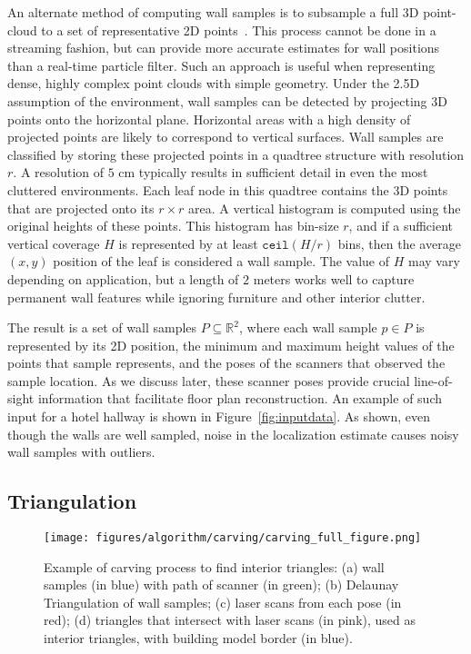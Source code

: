 \documentclass[a4paper,twoside]{article}
\begin{document}
An alternate method of computing wall samples is to subsample a full 3D point-cloud to a set of representative 2D points~\cite{Eigencrust,Okorn09}.  This process cannot be done in a streaming fashion, but can provide more accurate estimates for wall positions than a real-time particle filter.  Such an approach is useful when representing dense, highly complex point clouds with simple geometry.  Under the 2.5D assumption of the environment, wall samples can be detected by projecting 3D points onto the horizontal plane.  Horizontal areas with a high density of projected points are likely to correspond to vertical surfaces.  Wall samples are classified by storing these projected points in a quadtree structure with resolution $r$.  A resolution of $5$ cm typically results in sufficient detail in even the most cluttered environments.  Each leaf node in this quadtree contains the 3D points that are projected onto its $r \times r$ area.  A vertical histogram is computed using the original heights of these points.  This histogram has bin-size $r$, and if a sufficient vertical coverage $H$ is represented by at least $\texttt{ceil}(H/r)$ bins, then the average $(x,y)$ position of the leaf is considered a wall sample.  The value of $H$ may vary depending on application, but a length of $2$ meters works well to capture permanent wall features while ignoring furniture and other interior clutter.

The result is a set of wall samples $P \subseteq \mathbb{R}^2$, where each wall sample $p \in P$ is represented by its 2D position, the minimum and maximum height values of the points that sample represents, and the poses of the scanners that observed the sample location.  As we discuss later, these scanner poses provide crucial line-of-sight information that facilitate floor plan reconstruction.  An example of such input for a hotel hallway is shown in Figure~\ref{fig:inputdata}.  As shown, even though the walls are well sampled, noise in the localization estimate causes noisy wall samples with outliers.

\subsection{Triangulation}
\label{sec:floorplancreation}

\begin{figure*}[t]
  \centering
  \texttt{[image: figures/algorithm/carving/carving\_full\_figure.png]}
  \caption{Example of carving process to find interior triangles:  (a) wall samples (in blue) with path of scanner (in green); (b) Delaunay Triangulation of wall samples; (c) laser scans from each pose (in red); (d) triangles that intersect with laser scans (in pink), used as interior triangles, with building model border (in blue).}
  \label{fig:floorplan_creation}
\end{figure*}
\end{document}
